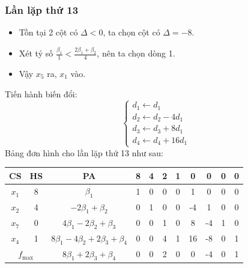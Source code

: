 \documentclass[12pt]{article}
\begin{document}
\subsubsection{Lần lặp thứ 13}
\begin{itemize}
\item Tồn tại 2 cột có $\Delta < 0$, ta chọn cột có $\Delta = -8$.
\item Xét tỷ số $\displaystyle \frac{\beta_1}{1} < \frac{2\beta_1 + \beta_2}{4}$, nên ta chọn dòng 1.
\item Vậy $x_5$ ra, $x_1$ vào.
\end{itemize}
Tiến hành biến đổi:
$$
\left\{
\begin{array}{lll}
d_1 \leftarrow d_1 \\
d_2 \leftarrow d_2 - 4d_1\\
d_3 \leftarrow d_3 + 8d_1\\
d_4 \leftarrow d_4 + 16d_1
\end{array}
\right.
$$
Bảng đơn hình cho lần lặp thứ 13 như sau:
\begin{table}[H]
\centering
\begin{tabular}{|c|c|c|c|c|c|c|c|c|c|c|}
\hline
CS & HS & PA & 8 & 4 & 2 & 1 & 0 & 0 & 0 & 0 \\
\hline
$x_1$ & 8 & $\beta_1$ & 1 & 0 & 0 & 0 & 1 & 0 & 0 & 0 \\
$x_2$ & 4 & $-2\beta_1 + \beta_2$ & 0 & 1 & 0 & 0 & -4 & 1 & 0 & 0 \\
$x_7$ & 0 & $4\beta_1 - 2\beta_2 + \beta_3$ & 0 & 0 & 1 & 0 & 8 & -4 & 1 & 0 \\
$x_4$ & 1 & $8\beta_1 - 4\beta_2 + 2\beta_3 + \beta_4$ & 0 & 0 & 4 & 1 & 16 & -8 & 0 & 1 \\
\hline
\multicolumn{2}{|c|}{$f_{\max}$}
& $8\beta_1 + 2\beta_3 + \beta_4$ & 0 & 0 & 2 & 0 & 0 & -4 & 0 & 1 \\
\hline
\end{tabular}
\end{table}
\end{document}
